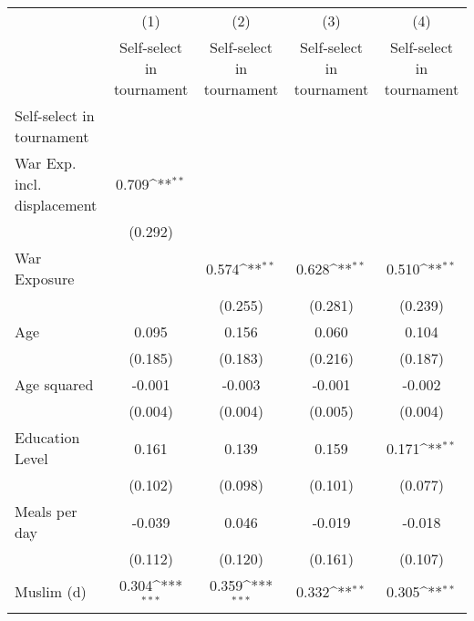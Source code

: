 {
\def\sym#1{\ifmmode^{#1}\else\(^{#1}\)\fi}
\begin{tabular}{l*{4}{c}}
\hline\hline
                    &\multicolumn{1}{c}{(1)}&\multicolumn{1}{c}{(2)}&\multicolumn{1}{c}{(3)}&\multicolumn{1}{c}{(4)}\\
                    &\multicolumn{1}{c}{Self-select in tournament}&\multicolumn{1}{c}{Self-select in tournament}&\multicolumn{1}{c}{Self-select in tournament}&\multicolumn{1}{c}{Self-select in tournament}\\
\hline
Self-select in tournament&                     &                     &                     &                     \\
War Exp. incl. displacement&       0.709\sym{**} &                     &                     &                     \\
                    &     (0.292)         &                     &                     &                     \\
[1em]
War Exposure        &                     &       0.574\sym{**} &       0.628\sym{**} &       0.510\sym{**} \\
                    &                     &     (0.255)         &     (0.281)         &     (0.239)         \\
[1em]
Age                 &       0.095         &       0.156         &       0.060         &       0.104         \\
                    &     (0.185)         &     (0.183)         &     (0.216)         &     (0.187)         \\
[1em]
Age squared         &      -0.001         &      -0.003         &      -0.001         &      -0.002         \\
                    &     (0.004)         &     (0.004)         &     (0.005)         &     (0.004)         \\
[1em]
Education Level     &       0.161         &       0.139         &       0.159         &       0.171\sym{**} \\
                    &     (0.102)         &     (0.098)         &     (0.101)         &     (0.077)         \\
[1em]
Meals per day       &      -0.039         &       0.046         &      -0.019         &      -0.018         \\
                    &     (0.112)         &     (0.120)         &     (0.161)         &     (0.107)         \\
[1em]
Muslim (d)          &       0.304\sym{***}&       0.359\sym{***}&       0.332\sym{**} &       0.305\sym{**} \\

\end{tabular}}
